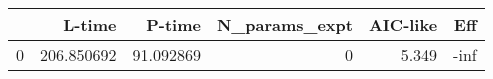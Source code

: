 \begin{tabular}{lrrrrr}
\toprule
{} &      L-time &     P-time &  N\_params\_expt &  AIC-like &  Eff \\
\midrule
0 &  206.850692 &  91.092869 &              0 &     5.349 & -inf \\
\bottomrule
\end{tabular}
